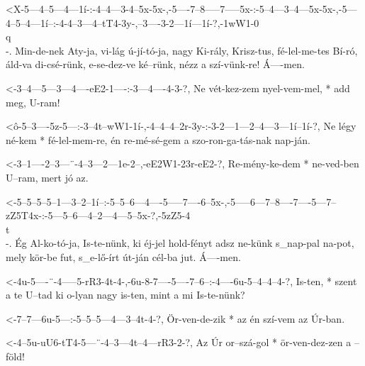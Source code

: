 
  {<X-5---4--5---4---1í-:-4--4---3-4--5x-5x-,-5----7--8-----7-----5x-:-5--4---3--4---5x-5x-,-5---4--5--4---1í--:-4-4--3---4--tT4-3y-,--3----3-2---1í---1í-?,-1wW1-0\\q\\-.}
  {   Min-de-nek Aty-ja,  vi-lág ú-jí-tó-ja,  nagy Ki-rály, Krisz-tus, fé-lel-me-tes Bí-ró,  áld-va di-csé-rünk, e-se-dez-ve ké--rünk, nézz a szí-vünk-re!   Á----men.}

  {<-3--4---5---3---4----eE2-1----:-3---4----4-3-?,}
  {  Ne vét-kez-zem nyel-vem-mel, * add meg, U-ram!}

  {<ô-5--3----5z-5---:-3--4t--wW1-1í-,-4--4--4--2r-3y-:-3-2---1---2--4---3---1í--1í-?,}
  {   Ne légy né-kem * fé-lel-mem-re,  én re-mé-sé-gem  a szo-ron-ga-tás-nak nap-ján.}

  {<-3--1----2--3---¨-4--3---2---1e-2--,-eE2W1-23r-eE2-?,}
  {  Re-mény-ke-dem * ne-ved-ben U--ram, mert  jó  az.}


  {<-5--5--5--5--1---3--2--1í--:-5--5--6---4----5-----7----6--5x-,-5-----6---7--8----7----5---7--zZ5T4x-:-5---5--6---4--2---4---5--5x-?,-5zZ5-4\\t\\-.}
  {  Ég Al-ko-tó-ja, Is-te-nünk, ki éj-jel hold-fényt adsz ne-künk s_nap-pal na-pot, mely kör-be fut,     s_e-lő-írt út-ján cél-ba jut.  Á----men.}

  {<-4u-5----¨-4-----5-rR3-4t-4-,-6u-8-7----5----7--6--:-4----6u-5--4--4--4-?,}
  {  Is-ten, * szent a te  U--tad ki o-lyan nagy is-ten, mint a  mi Is-te-nünk?}

  {<-7--7---6u-5---:-5--5--5---4---3--4t-4-?,}
  {  Ör-ven-de-zik * az én szí-vem az Úr-ban.}

  {<-4--5u-uU6-tT4-5---¨-4--3---4t--4---rR3-2-?,}
  {  Az Úr or--szá-gol * ör-ven-dez-zen a --föld!}

